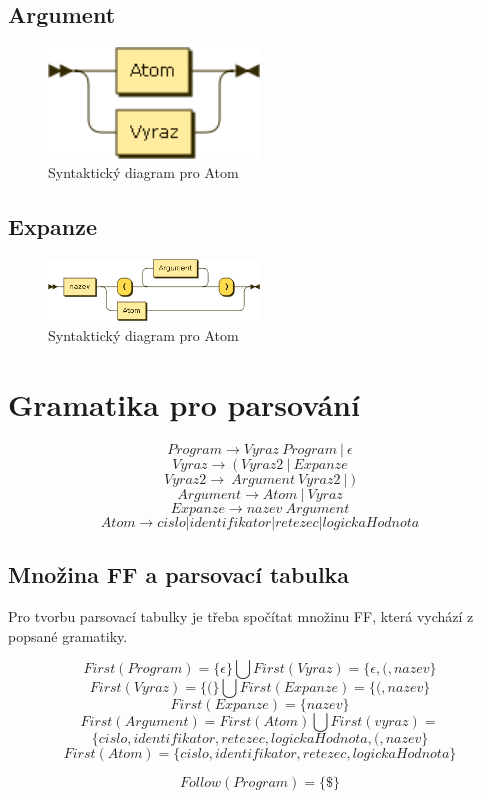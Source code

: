 \documentclass[a4paper,11pt]{article}
\begin{document}
\subsection{Argument}
\begin{figure}[!h]
    \centering
    \includegraphics[width=0.5\textwidth]{obrazky/Argument.png}
    \caption{Syntaktický diagram pro Atom}
    \label{fig:Syntaktický diagram pro Atom}
\end{figure}

\subsection{Expanze}
\begin{figure}[!h]
    \centering
    \includegraphics[width=0.5\textwidth]{obrazky/Expanze.png}
    \caption{Syntaktický diagram pro Atom}
    \label{fig:Syntaktický diagram pro Atom}
\end{figure}

\section{Gramatika pro parsování}
$$Program \rightarrow Vyraz\:Program\:|\:\epsilon$$
$$Vyraz \rightarrow\:(\:Vyraz2\:|\:Expanze$$
$$Vyraz2 \rightarrow\:Argument\:Vyraz2\:|\:)$$
$$Argument \rightarrow Atom\:|\:Vyraz$$
$$Expanze \rightarrow nazev\:Argument$$
$$Atom \rightarrow cislo | identifikator | retezec | logickaHodnota$$

\subsection{Množina FF a parsovací tabulka}
Pro tvorbu parsovací tabulky je třeba spočítat množinu FF, která vychází z popsané gramatiky.

$$First(Program) = \{ \epsilon \} \bigcup First(Vyraz) = \{\epsilon, (, nazev\}$$
$$First(Vyraz) = \{ ( \} \bigcup First(Expanze) = \{(, nazev\}$$
$$First(Expanze) = \{ nazev \}$$
$$First(Argument) = First(Atom) \bigcup First(vyraz) = $$
$$\{cislo, identifikator,retezec, logickaHodnota, (, nazev\}$$
$$First(Atom) = \{cislo, identifikator, retezec, logickaHodnota\}$$

$$Follow(Program) = \{\$\}$$
\end{document}
